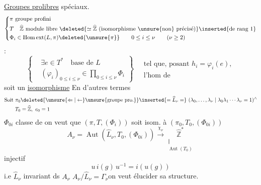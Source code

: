 \uline{Groupes prolibres} spéciaux.
\[
\left\{\begin{aligned}
&\pi\text{ groupe profini}\\
&T\quad\widehat{\mathbb Z}\text{ module libre }\deleted{\simeq\widehat{\mathbb Z}\text{ (isomorphisme \unsure{non} précisé)}}\inserted{\text{de rang }1}\\
&\Phi_i\in\operatorname{Hom\,ext}(L,\pi)\deleted{\unsure{\pi}}\qquad 0\leq i\leq\nu\qquad(\nu\geq2)
\end{aligned}\right.
\]
 :
\[
\left\{\begin{aligned}
&\exists e\in T^*\quad\text{base de }L\\
&(\varphi_i)_{0\leq i\leq\nu}\in\prod_{0\leq i\leq\nu}\Phi_i
\end{aligned}\right\}\quad
\begin{gathered}
\text{tel que, posant }h_i=\varphi_i(e),\\
\text{l'hom de}
\end{gathered}
\]
soit un \uline{isomorphisme}
En d'autres termes
\[
\begin{aligned}
\text{Soit }\pi_0&\deleted{\unsure{\Leftarrow|\leftarrow}\text{\unsure{groupe pro.}}}\inserted{=\widehat L_\nu=}\ (\lambda_0,\ldots,\lambda_\nu\mid\lambda_0\lambda_1\cdots\lambda_\nu=1)^{\wedge}\\
T_0&=\widehat{\mathbb Z},\ e_0=1
\end{aligned}
\]
$\Phi_{0i}$ classe de
on veut que $(\pi,T,(\Phi_i))$ soit isom. à $(\pi_0,T_0,(\Phi_{0i}))$
\[
A_\nu=\operatorname{Aut}(\widehat L_\nu,T_0,(\Phi_{0i}))\xrightarrow{\chi_\nu}
\underset{\substack{\Vert\\\operatorname{Aut}(T_0)}}{\widehat{\mathbb Z}^{*}}
\]
injectif
\[
u\,i(g)\,u^{-1}=i(u(g))
\]
i.e $\widehat L_\nu$ invariant ds $A_\nu$
$A_\nu/\widehat L_\nu=\Gamma_\nu$\quad on veut élucider sa structure.
